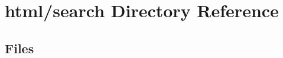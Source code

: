 \section{html/search Directory Reference}
\label{dir_0f667562209a5fbb939aec100aca91be}
\subsection*{Files}
\begin{DoxyCompactItemize}
\end{DoxyCompactItemize}
